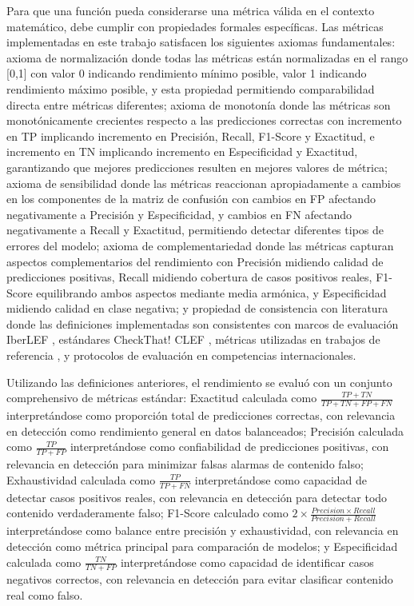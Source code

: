 Para que una función pueda considerarse una métrica válida en el contexto matemático, debe cumplir con propiedades formales específicas. Las métricas implementadas en este trabajo satisfacen los siguientes axiomas fundamentales: axioma de normalización donde todas las métricas están normalizadas en el rango [0,1] con valor 0 indicando rendimiento mínimo posible, valor 1 indicando rendimiento máximo posible, y esta propiedad permitiendo comparabilidad directa entre métricas diferentes; axioma de monotonía donde las métricas son monotónicamente crecientes respecto a las predicciones correctas con incremento en TP implicando incremento en Precisión, Recall, F1-Score y Exactitud, e incremento en TN implicando incremento en Especificidad y Exactitud, garantizando que mejores predicciones resulten en mejores valores de métrica; axioma de sensibilidad donde las métricas reaccionan apropiadamente a cambios en los componentes de la matriz de confusión con cambios en FP afectando negativamente a Precisión y Especificidad, y cambios en FN afectando negativamente a Recall y Exactitud, permitiendo detectar diferentes tipos de errores del modelo; axioma de complementariedad donde las métricas capturan aspectos complementarios del rendimiento con Precisión midiendo calidad de predicciones positivas, Recall midiendo cobertura de casos positivos reales, F1-Score equilibrando ambos aspectos mediante media armónica, y Especificidad midiendo calidad en clase negativa; y propiedad de consistencia con literatura donde las definiciones implementadas son consistentes con marcos de evaluación IberLEF \cite{aragon2020overview}, estándares CheckThat! CLEF \cite{barron2023clef}, métricas utilizadas en trabajos de referencia \cite{posadas2019detection, blanco2024enhancing}, y protocolos de evaluación en competencias internacionales.

Utilizando las definiciones anteriores, el rendimiento se evaluó con un conjunto comprehensivo de métricas estándar: Exactitud calculada como $\frac{TP + TN}{TP + TN + FP + FN}$ interpretándose como proporción total de predicciones correctas, con relevancia en detección como rendimiento general en datos balanceados; Precisión calculada como $\frac{TP}{TP + FP}$ interpretándose como confiabilidad de predicciones positivas, con relevancia en detección para minimizar falsas alarmas de contenido falso; Exhaustividad calculada como $\frac{TP}{TP + FN}$ interpretándose como capacidad de detectar casos positivos reales, con relevancia en detección para detectar todo contenido verdaderamente falso; F1-Score calculado como $2 \times \frac{Precision \times Recall}{Precision + Recall}$ interpretándose como balance entre precisión y exhaustividad, con relevancia en detección como métrica principal para comparación de modelos; y Especificidad calculada como $\frac{TN}{TN + FP}$ interpretándose como capacidad de identificar casos negativos correctos, con relevancia en detección para evitar clasificar contenido real como falso.

